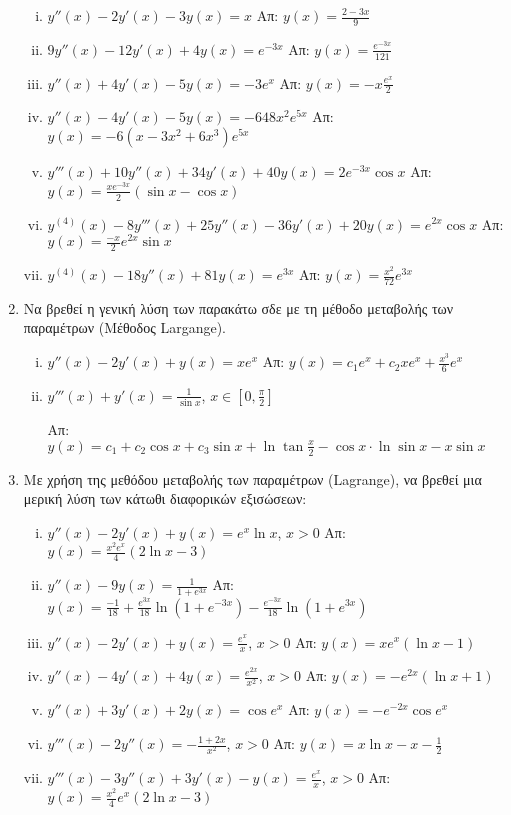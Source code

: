 \begin{enumerate}
\begin{enumerate}[i)]
  \item $y''(x)-2y'(x)-3y(x)=x$ \hfill Απ: $y(x)=\frac{2-3x}{9}$
  \item $9y''(x)-12y'(x)+4y(x)=e^{-3x}$ \hfill Απ: $y(x)=\frac{e^{-3x}}{121}$
  \item $y''(x)+4y'(x)-5y(x)=-3e^{x}$ \hfill Απ: $y(x)=-x\frac{e^{x}}{2}$
  \item $y''(x)-4y'(x)-5y(x)=-648x^{2}e^{5x}$ \hfill Απ: $ y(x)=-6(x-3x^{2}+6x^{3})e^{5x}$
  \item $y'''(x)+10y''(x)+34y'(x)+40y(x)=2e^{-3x}\cos x$ \hfill Απ: $y(x)= \frac{xe^{-3x}}{2}(\sin x - \cos x)$
  \item $y^{(4)}(x)-8y'''(x)+25y''(x)-36y'(x)+20y(x)=e^{2x}\cos x$ \hfill Απ: $y(x) =\frac{-x}{2}e^{2x}\sin x$
  \item $y^{(4)}(x)-18y''(x)+81y(x)=e^{3x}$ \hfill Απ: $y(x)=\frac{x^{2}}{72}e^{3x}$

\end{enumerate}

\item Να βρεθεί η γενική λύση των παρακάτω σδε με τη μέθοδο μεταβολής των παραμέτρων (Μέθοδος \textlatin{Largange}).

\begin{enumerate}[i)]
  \item $y''(x)-2y'(x)+y(x)=xe^{x}$ \hfill Απ: $y(x)=c_{1}e^{x}+c_{2}xe^{x}+\frac{x^{3}}{6}e^{x}$
  \item $y'''(x)+y'(x)=\frac{1}{\sin x}$, $x\in [0,\frac{\pi}{2}]$

   \hfill Απ: $y(x)=c_{1}+c_2\cos x+c_3 \sin x+\ln \tan \frac{x}{2}-\cos x\cdot\ln\sin x-x\sin x$

   \end{enumerate}

   \item Με χρήση της μεθόδου μεταβολής των παραμέτρων (\textlatin{Lagrange}), να βρεθεί μια μερική λύση των κάτωθι διαφορικών εξισώσεων:

   \begin{enumerate}[i)]
  \item $y''(x)-2y'(x)+y(x)=e^{x}\ln x$, $x>0$ \hfill Απ: $y(x)=\frac{x^{2}e^{x}}{4}(2\ln x-3)$
  \item $y''(x)-9y(x)=\frac{1}{1+e^{3x}}$ \hfill Απ: $y(x)=\frac{-1}{18}+\frac{e^{3x}}{18}\ln (1+e^{-3x})-\frac{e^{-3x}}{18}\ln(1+e^{3x})$
  \item $y''(x)-2y'(x)+y(x)=\frac{e^x}{x}$, $x>0$ \hfill Απ: $y(x)=xe^{x}(\ln x-1)$
  \item $y''(x)-4y'(x)+4y(x)=\frac{e^{2x}}{x^{2}}$, $x>0$ \hfill Απ: $y(x)=-e^{2x}(\ln x +1)$
  \item $y''(x)+3y'(x)+2y(x)=\cos e^{x}$ \hfill Απ: $y(x)=-e^{-2x}\cos e^{x}$
  \item $y'''(x)-2y''(x)=-\frac{1+2x}{x^{2}}$, $x>0$ \hfill Απ: $y(x)=x\ln x-x -\frac{1}{2}$
  \item $y'''(x)-3y''(x)+3y'(x)-y(x)=\frac{e^{x}}{x}$, $x>0$ \hfill Απ: $y(x)=\frac{x^{2}}{4}e^{x}(2\ln x-3)$
\end{enumerate}


\end{enumerate}
